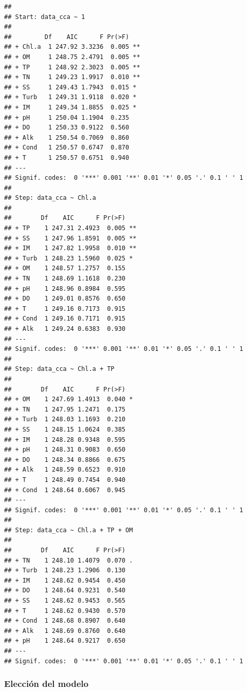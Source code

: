 \documentclass[
]{book}
\begin{document}
\begin{verbatim}
## 
## Start: data_cca ~ 1 
## 
##         Df    AIC      F Pr(>F)   
## + Chl.a  1 247.92 3.3236  0.005 **
## + OM     1 248.75 2.4791  0.005 **
## + TP     1 248.92 2.3023  0.005 **
## + TN     1 249.23 1.9917  0.010 **
## + SS     1 249.43 1.7943  0.015 * 
## + Turb   1 249.31 1.9118  0.020 * 
## + IM     1 249.34 1.8855  0.025 * 
## + pH     1 250.04 1.1904  0.235   
## + DO     1 250.33 0.9122  0.560   
## + Alk    1 250.54 0.7069  0.860   
## + Cond   1 250.57 0.6747  0.870   
## + T      1 250.57 0.6751  0.940   
## ---
## Signif. codes:  0 '***' 0.001 '**' 0.01 '*' 0.05 '.' 0.1 ' ' 1
## 
## Step: data_cca ~ Chl.a 
## 
##        Df    AIC      F Pr(>F)   
## + TP    1 247.31 2.4923  0.005 **
## + SS    1 247.96 1.8591  0.005 **
## + IM    1 247.82 1.9958  0.010 **
## + Turb  1 248.23 1.5960  0.025 * 
## + OM    1 248.57 1.2757  0.155   
## + TN    1 248.69 1.1618  0.230   
## + pH    1 248.96 0.8984  0.595   
## + DO    1 249.01 0.8576  0.650   
## + T     1 249.16 0.7173  0.915   
## + Cond  1 249.16 0.7171  0.915   
## + Alk   1 249.24 0.6383  0.930   
## ---
## Signif. codes:  0 '***' 0.001 '**' 0.01 '*' 0.05 '.' 0.1 ' ' 1
## 
## Step: data_cca ~ Chl.a + TP 
## 
##        Df    AIC      F Pr(>F)  
## + OM    1 247.69 1.4913  0.040 *
## + TN    1 247.95 1.2471  0.175  
## + Turb  1 248.03 1.1693  0.210  
## + SS    1 248.15 1.0624  0.385  
## + IM    1 248.28 0.9348  0.595  
## + pH    1 248.31 0.9083  0.650  
## + DO    1 248.34 0.8866  0.675  
## + Alk   1 248.59 0.6523  0.910  
## + T     1 248.49 0.7454  0.940  
## + Cond  1 248.64 0.6067  0.945  
## ---
## Signif. codes:  0 '***' 0.001 '**' 0.01 '*' 0.05 '.' 0.1 ' ' 1
## 
## Step: data_cca ~ Chl.a + TP + OM 
## 
##        Df    AIC      F Pr(>F)  
## + TN    1 248.10 1.4079  0.070 .
## + Turb  1 248.23 1.2906  0.130  
## + IM    1 248.62 0.9454  0.450  
## + DO    1 248.64 0.9231  0.540  
## + SS    1 248.62 0.9453  0.565  
## + T     1 248.62 0.9430  0.570  
## + Cond  1 248.68 0.8907  0.640  
## + Alk   1 248.69 0.8760  0.640  
## + pH    1 248.64 0.9217  0.650  
## ---
## Signif. codes:  0 '***' 0.001 '**' 0.01 '*' 0.05 '.' 0.1 ' ' 1
\end{verbatim}

\hypertarget{elecciuxf3n-del-modelo}{%
\subsubsection{Elección del modelo}\label{elecciuxf3n-del-modelo}}
\end{document}
